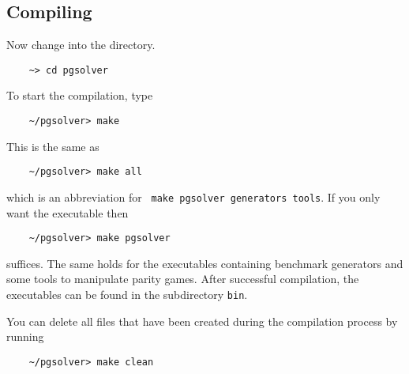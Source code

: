 \subsection{Compiling \pgsolver}

Now change into the \pgsolver directory.
\begin{verbatim}
    ~> cd pgsolver
\end{verbatim}

To start the compilation, type 
\begin{verbatim}
    ~/pgsolver> make
\end{verbatim}
This is the same as
\begin{verbatim}
    ~/pgsolver> make all
\end{verbatim}
which is an abbreviation for \verb# make pgsolver generators tools#. If you only want the executable \pgsolver then 
\begin{verbatim}
    ~/pgsolver> make pgsolver
\end{verbatim}
suffices. The same holds for the executables containing benchmark generators and some tools to manipulate parity games.
After successful compilation, the executables can be found in the
subdirectory \texttt{bin}.

You can delete all files that have been created during the compilation process by running
\begin{verbatim}
    ~/pgsolver> make clean
\end{verbatim}




